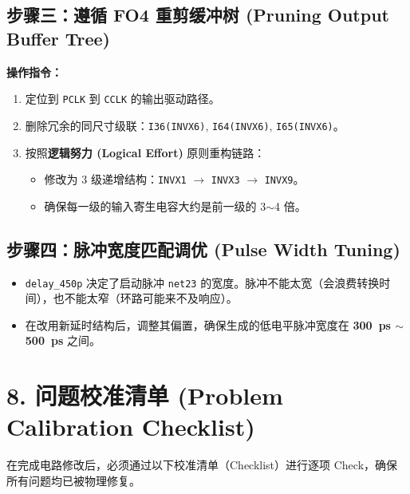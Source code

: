 \documentclass[11pt,a4paper,UTF8]{ctexart}
\begin{document}
\subsection{步骤三：遵循 FO4 重剪缓冲树 (Pruning Output Buffer Tree)}

\textbf{操作指令：}
\begin{enumerate}
    \item 定位到 \texttt{PCLK} 到 \texttt{CCLK} 的输出驱动路径。
    \item 删除冗余的同尺寸级联：\texttt{I36(INVX6)}, \texttt{I64(INVX6)}, \texttt{I65(INVX6)}。
    \item 按照\textbf{逻辑努力 (Logical Effort)} 原则重构链路：
    \begin{itemize}
        \item 修改为 3 级递增结构：\texttt{INVX1} $\rightarrow$ \texttt{INVX3} $\rightarrow$ \texttt{INVX9}。
        \item 确保每一级的输入寄生电容大约是前一级的 3$\sim$4 倍。
    \end{itemize}
\end{enumerate}

\subsection{步骤四：脉冲宽度匹配调优 (Pulse Width Tuning)}

\begin{itemize}
    \item \texttt{delay\_450p} 决定了启动脉冲 \texttt{net23} 的宽度。脉冲不能太宽（会浪费转换时间），也不能太窄（环路可能来不及响应）。
    \item 在改用新延时结构后，调整其偏置，确保生成的低电平脉冲宽度在 \textbf{\SI{300}{ps} $\sim$ \SI{500}{ps}} 之间。
\end{itemize}

\section{8. 问题校准清单 (Problem Calibration Checklist)}

在完成电路修改后，必须通过以下校准清单（Checklist）进行逐项 Check，确保所有问题均已被物理修复。
\end{document}
